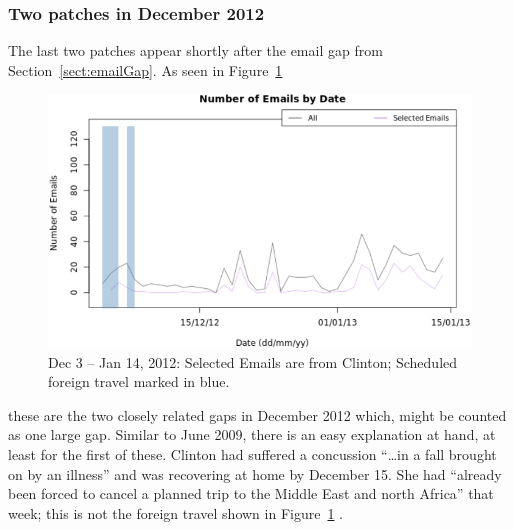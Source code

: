 \documentclass[journal]{vgtc}                %
\begin{document}
\subsubsection{Two patches in December 2012}
The last two patches appear 
shortly after the email gap from Section~\ref{sect:emailGap}.  As seen in Figure~\ref{fig:ZeroEmailsDec2012}
\begin{figure}[h]
\begin{center}
\includegraphics[width=0.95\linewidth]{ZeroEmailsDec2012}
\caption{Dec 3 -- Jan 14, 2012:  Selected Emails are from Clinton; Scheduled foreign travel marked in blue.}
\label{fig:ZeroEmailsDec2012}
\end{center}
\end{figure}
these are the two closely related gaps in December 2012 which,
might be counted as one large gap.
Similar to June 2009, there is an easy explanation at hand, at least for the first of these.  Clinton had suffered a concussion ``\ldots in a fall brought on by an illness'' \cite{concussion} and was recovering at home by December 15.  She had ``already been forced to cancel a planned trip to the Middle East and north Africa'' \cite{concussion} that week; this is not the foreign travel shown in Figure~\ref{fig:ZeroEmailsDec2012} \cite{ForeignSched}.  
\end{document}
